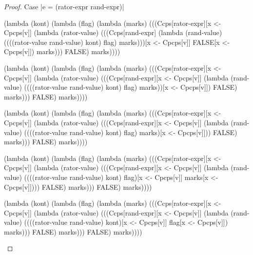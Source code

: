 \begin{proof}{Case \scheme|e = (rator-expr rand-expr)|}
\begin{schemeblock}
\begin{schemedisplay}
(lambda (kont)
   (lambda (flag)
     (lambda (marks)
       (((Ccps[rator-expr][x <- Cpcps[v]]
          (lambda (rator-value)
            (((Ccps[rand-expr]
               (lambda (rand-value)
                 ((((rator-value rand-value) kont) flag) marks)))[x <- Cpcps[v]]
              FALSE[x <- Cpcps[v]]) marks)))
         FALSE) marks))))
\end{schemedisplay}
\end{schemeblock}

\begin{schemeblock}
\begin{schemedisplay}
(lambda (kont)
   (lambda (flag)
     (lambda (marks)
       (((Ccps[rator-expr][x <- Cpcps[v]]
          (lambda (rator-value)
            (((Ccps[rand-expr][x <- Cpcps[v]]
               (lambda (rand-value)
                 ((((rator-value rand-value) kont) flag) marks))[x <- Cpcps[v]])
              FALSE) marks)))
         FALSE) marks))))
\end{schemedisplay}
\end{schemeblock}

\begin{schemeblock}
\begin{schemedisplay}
(lambda (kont)
   (lambda (flag)
     (lambda (marks)
       (((Ccps[rator-expr][x <- Cpcps[v]]
          (lambda (rator-value)
            (((Ccps[rand-expr][x <- Cpcps[v]]
               (lambda (rand-value)
                 ((((rator-value rand-value) kont) flag) marks)[x <- Cpcps[v]]))
              FALSE) marks)))
         FALSE) marks))))
\end{schemedisplay}
\end{schemeblock}

\begin{schemeblock}
\begin{schemedisplay}
(lambda (kont)
   (lambda (flag)
     (lambda (marks)
       (((Ccps[rator-expr][x <- Cpcps[v]]
          (lambda (rator-value)
            (((Ccps[rand-expr][x <- Cpcps[v]]
               (lambda (rand-value)
                 ((((rator-value rand-value) kont) flag)[x <- Cpcps[v]] marks[x <- Cpcps[v]])))
              FALSE) marks)))
         FALSE) marks))))
\end{schemedisplay}
\end{schemeblock}

\begin{schemeblock}
\begin{schemedisplay}
(lambda (kont)
   (lambda (flag)
     (lambda (marks)
       (((Ccps[rator-expr][x <- Cpcps[v]]
          (lambda (rator-value)
            (((Ccps[rand-expr][x <- Cpcps[v]]
               (lambda (rand-value)
                 ((((rator-value rand-value) kont)[x <- Cpcps[v]] flag[x <- Cpcps[v]]) marks)))
              FALSE) marks)))
         FALSE) marks))))
\end{schemedisplay}
\end{schemeblock}


\end{proof}
